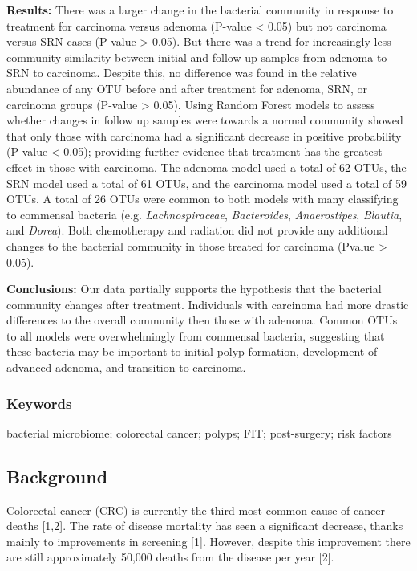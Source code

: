 \documentclass[12pt,]{article}
\begin{document}
\textbf{Results:} There was a larger change in the bacterial community
in response to treatment for carcinoma versus adenoma (P-value
\textless{} 0.05) but not carcinoma versus SRN cases (P-value
\textgreater{} 0.05). But there was a trend for increasingly less
community similarity between initial and follow up samples from adenoma
to SRN to carcinoma. Despite this, no difference was found in the
relative abundance of any OTU before and after treatment for adenoma,
SRN, or carcinoma groups (P-value \textgreater{} 0.05). Using Random
Forest models to assess whether changes in follow up samples were
towards a normal community showed that only those with carcinoma had a
significant decrease in positive probability (P-value \textless{} 0.05);
providing further evidence that treatment has the greatest effect in
those with carcinoma. The adenoma model used a total of 62 OTUs, the SRN
model used a total of 61 OTUs, and the carcinoma model used a total of
59 OTUs. A total of 26 OTUs were common to both models with many
classifying to commensal bacteria (e.g. \emph{Lachnospiraceae},
\emph{Bacteroides}, \emph{Anaerostipes}, \emph{Blautia}, and
\emph{Dorea}). Both chemotherapy and radiation did not provide any
additional changes to the bacterial community in those treated for
carcinoma (Pvalue \textgreater{} 0.05).

\textbf{Conclusions:} Our data partially supports the hypothesis that
the bacterial community changes after treatment. Individuals with
carcinoma had more drastic differences to the overall community then
those with adenoma. Common OTUs to all models were overwhelmingly from
commensal bacteria, suggesting that these bacteria may be important to
initial polyp formation, development of advanced adenoma, and transition
to carcinoma.

\newpage

\subsubsection{Keywords}\label{keywords}

bacterial microbiome; colorectal cancer; polyps; FIT; post-surgery; risk
factors

\newpage

\subsection{Background}\label{background}

Colorectal cancer (CRC) is currently the third most common cause of
cancer deaths {[}1,2{]}. The rate of disease mortality has seen a
significant decrease, thanks mainly to improvements in screening
{[}1{]}. However, despite this improvement there are still approximately
50,000 deaths from the disease per year {[}2{]}.
\end{document}
